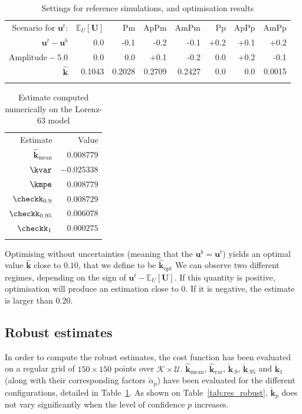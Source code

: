 \documentclass[npg, manuscript]{copernicus}
\newcommand{\Ex}{\mathbb{E}}
\newcommand{\kmean}{\hat{\mathbf{k}}_{\mathrm{mean}}}
\begin{document}
\begin{table}[!h]
  \caption{Settings for reference simulations, and optimisation results}
  \label{tab:optim_scenar}
\begin{tabular}{rrrrrrrr} \tophline
Scenario for $\mathbf{u}^t$: &$\Ex_U[\mathbf{U}]$  & Pm & ApPm & AmPm & Pp & ApPp & AmPp \\ \middlehline
  $\mathbf{u}^t- \mathbf{u}^b$ & 0.0            & -0.1  & -0.2 & -0.1 & +0.2 & +0.1 & +0.2 \\
  $\mathrm{Amplitude}- 5.0$   & 0.0             &  0.0  & +0.1 & -0.2 &  0.0 & +0.2 & -0.1 \\ \middlehline
  $\hat{\mathbf{k}}$      & 0.1043          & 0.2028 & 0.2709 & 0.2427 & 0.0  & 0.0 & 0.0015 \\\bottomhline
\end{tabular}
\end{table}

\begin{table}[!h]
  \caption{Estimate computed numerically on the Lorenz-63 model}
  \begin{tabular}{*{2}{r}}\tophline
    Estimate & Value \\
    \middlehline
    $\kmean$       & $ 0.008779$ \\
    $\kvar$        & $-0.025338$ \\
    $\kmpe$        & $ 0.008779$ \\
    $\checkk_{0.9}$ & $ 0.008729$ \\
    $\checkk_{0.95}$& $ 0.006078$ \\
    $\checkk_{1}$ &  $ 0.000275$ \\
    \bottomhline
    \end{tabular}
\end{table}

Optimising without uncertainties (meaning that the $\mathbf{u}^b=\mathbf{u}^t$) yields an optimal value $\hat{\mathbf{k}}$ close to $0.10$, that we define to be $\hat{\mathbf{k}}_{\mathrm{opt}}$
We can observe two different regimes, depending on the sign of $\mathbf{u}^t-\Ex_U[\mathbf{U}]$. If this quantity is positive, optimisation will produce an estimation close to $0$. If it is negative, the estimate is larger than $0.20$.
\subsection{Robust estimates}
In order to compute the robust estimates, the cost function has been evaluated on a regular grid of $150\times150$ points over $\mathcal{K}\times\mathcal{U}$. $\hat{\mathbf{k}}_{\mathrm{mean}}$, $\hat{\mathbf{k}}_{\mathrm{var}}$, $\check{\mathbf{k}}_{.9}$, $\check{\mathbf{k}}_{.95}$ and $\check{\mathbf{k}}_{1}$ (along with their corresponding factors $\check{\alpha}_p$) have been evaluated for the different configurations, detailed in Table~\ref{tab:optim_scenar}. As shown on Table~\ref{tab:res_robust}, $\check{\mathbf{k}}_p$ does not vary significantly when the level of confidence $p$ increases.
\end{document}
